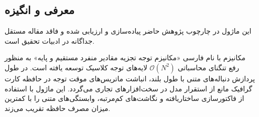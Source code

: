 \subsection{معرفی و انگیزه}
این ماژول در چارچوب پژوهش حاضر پیاده‌سازی و ارزیابی شده و فاقد مقاله مستقل جداگانه در ادبیات تحقیق است.

مکانیزم  با نام فارسی «مکانیزم توجه تجزیه مقادیر منفرد مستقیم و پایه» به منظور رفع تنگنای محاسباتی $\mathcal{O}(N^2)$ لایه‌های توجه کلاسیک توسعه یافته است. در طول پردازش دنباله‌های متنی با طول بلند، انباشت ماتریس‌های موقت توجه در حافظه کارت گرافیک مانع از استقرار مدل در سخت‌افزارهای تجاری می‌گردد. این ماژول با استفاده از فاکتورسازی ساختاریافته و نگاشت‌های کم‌مرتبه، وابستگی‌های متنی را با کمترین میزان مصرف حافظه تقریب می‌زند.
